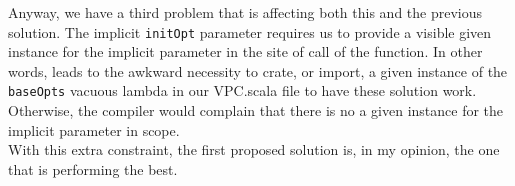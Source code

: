 Anyway, we have a third problem that is affecting both this and the previous solution.
The implicit \texttt{initOpt} parameter requires us to provide a visible given instance for the implicit parameter in the site of call of the function.
In other words, leads to the awkward necessity to crate, or import, a given instance of the \texttt{baseOpts} vacuous lambda in our VPC.scala file to have these solution work. 
Otherwise, the compiler would complain that there is no a given instance for the implicit parameter in scope.\\
With this extra constraint, the first proposed solution is, in my opinion, the one that is performing the best.
%

